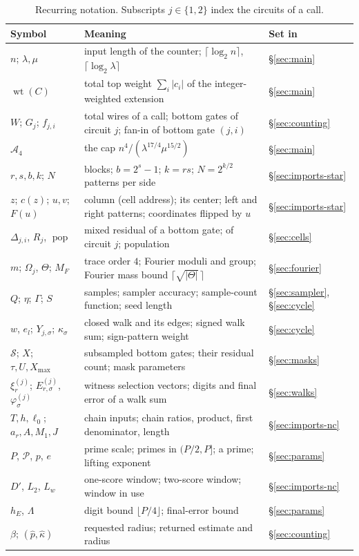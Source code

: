 \documentclass[11pt,letterpaper]{article}
\theoremstyle{definition}
\theoremstyle{remark}
\newcommand{\pop}{\operatorname{pop}}
\newcommand{\cP}{\mathcal P}
\newcommand{\cS}{\mathcal S}
\newcommand{\topwt}{\operatorname{wt}}
\newcommand{\lgx}{\log_2}
\newcommand{\Xmax}{X_{\max}}
\newcommand{\phat}{\widehat p}
\newcommand{\khat}{\widehat\kappa}
\begin{document}
\begin{table}[!htbp]
\centering\small
\begin{tabularx}{\textwidth}{@{}>{\raggedright\arraybackslash}p{}X>{\raggedright\arraybackslash}p{}@{}}
\toprule
Symbol & Meaning & Set in\\
\midrule
\(n\); \(\lambda,\mu\) & input length of the counter; \(\lceil\lgx n\rceil\), \(\lceil\lgx\lambda\rceil\) & \S\ref{sec:main}\\
\(\topwt(C)\) & total top weight \(\sum_i|c_i|\) of the integer-weighted extension & \S\ref{sec:main}\\
\(W\); \(G_j\); \(f_{j,i}\) & total wires of a call; bottom gates of circuit \(j\); fan-in of bottom gate \((j,i)\) & \S\ref{sec:counting}\\
\(\mathcal A_4\) & the cap \(n^4/(\lambda^{17/4}\mu^{15/2})\) & \S\ref{sec:main}\\
\(r,s,b,k\); \(N\) & blocks; \(b=2^s-1\); \(k=rs\); \(N=2^{k/2}\) patterns per side & \S\ref{sec:imports-star}\\
\(z\); \(c(z)\); \(u,v\); \(F(u)\) & column (cell address); its center; left and right patterns; coordinates flipped by \(u\) & \S\ref{sec:imports-star}\\
\(\Delta_{j,i}\), \(R_j\), \(\pop\) & mixed residual of a bottom gate; of circuit \(j\); population & \S\ref{sec:cells}\\
\(m\); \(\Omega_j\), \(\Theta\); \(M_F\) & trace order \(4\); Fourier moduli and group; Fourier mass bound \(\lceil\sqrt{|\Theta|}\,\rceil\) & \S\ref{sec:fourier}\\
\(Q\); \(\eta\); \(\Gamma\); \(S\) & samples; sampler accuracy; sample-count function; seed length & \S\ref{sec:sampler}, \S\ref{sec:cycle}\\
\(w\), \(e_l\); \(Y_{j,\sigma}\); \(\kappa_\sigma\) & closed walk and its edges; signed walk sum; sign-pattern weight & \S\ref{sec:cycle}\\
\(\cS\); \(X\); \(\tau,U,\Xmax\) & subsampled bottom gates; their residual count; mask parameters & \S\ref{sec:masks}\\
\(\xi^{(j)}_r\); \(E^{(j)}_{r,\sigma}\), \(\varphi^{(j)}_\sigma\) & witness selection vectors; digits and final error of a walk sum & \S\ref{sec:walks}\\
\(T,h,\ell_0\); \(a_r,A,M_1,J\) & chain inputs; chain ratios, product, first denominator, length & \S\ref{sec:imports-nc}\\
\(P\), \(\cP\), \(p\), \(e\) & prime scale; primes in \((P/2,P]\); a prime; lifting exponent & \S\ref{sec:params}\\
\(D'\), \(L_2\), \(L_w\) & one-score window; two-score window; window in use & \S\ref{sec:imports-nc}\\
\(h_E\), \(\Lambda\) & digit bound \(\lfloor P/4\rfloor\); final-error bound & \S\ref{sec:params}\\
\(\beta\); \((\phat,\khat)\) & requested radius; returned estimate and radius & \S\ref{sec:counting}\\
\bottomrule
\end{tabularx}
\caption{Recurring notation. Subscripts \(j\in\{1,2\}\) index the
circuits of a call.}
\label{tab:notation}
\end{table}
\end{document}
